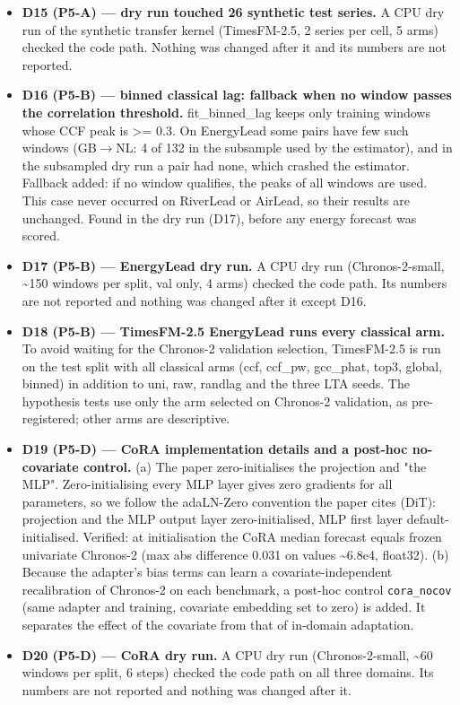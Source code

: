 \begin{itemize}
\item \textbf{D15 (P5-A) — dry run touched 26 synthetic test series.} A CPU dry run of the synthetic transfer kernel (TimesFM-2.5, 2 series per cell, 5 arms) checked the code path. Nothing was changed after it and its numbers are not reported.
\item \textbf{D16 (P5-B) — binned classical lag: fallback when no window passes the correlation threshold.} fit\_binned\_lag keeps only training windows whose CCF peak is >= 0.3. On EnergyLead some pairs have few such windows (GB$\rightarrow$NL: 4 of 132 in the subsample used by the estimator), and in the subsampled dry run a pair had none, which crashed the estimator. Fallback added: if no window qualifies, the peaks of all windows are used. This case never occurred on RiverLead or AirLead, so their results are unchanged. Found in the dry run (D17), before any energy forecast was scored.
\item \textbf{D17 (P5-B) — EnergyLead dry run.} A CPU dry run (Chronos-2-small, \textasciitilde{}150 windows per split, val only, 4 arms) checked the code path. Its numbers are not reported and nothing was changed after it except D16.
\item \textbf{D18 (P5-B) — TimesFM-2.5 EnergyLead runs every classical arm.} To avoid waiting for the Chronos-2 validation selection, TimesFM-2.5 is run on the test split with all classical arms (ccf, ccf\_pw, gcc\_phat, top3, global, binned) in addition to uni, raw, randlag and the three LTA seeds. The hypothesis tests use only the arm selected on Chronos-2 validation, as pre-registered; other arms are descriptive.
\item \textbf{D19 (P5-D) — CoRA implementation details and a post-hoc no-covariate control.} (a) The paper zero-initialises the projection and "the MLP". Zero-initialising every MLP layer gives zero gradients for all parameters, so we follow the adaLN-Zero convention the paper cites (DiT): projection and the MLP output layer zero-initialised, MLP first layer default-initialised. Verified: at initialisation the CoRA median forecast equals frozen univariate Chronos-2 (max abs difference 0.031 on values \textasciitilde{}6.8e4, float32). (b) Because the adapter's bias terms can learn a covariate-independent recalibration of Chronos-2 on each benchmark, a post-hoc control \texttt{cora\_nocov} (same adapter and training, covariate embedding set to zero) is added. It separates the effect of the covariate from that of in-domain adaptation.
\item \textbf{D20 (P5-D) — CoRA dry run.} A CPU dry run (Chronos-2-small, \textasciitilde{}60 windows per split, 6 steps) checked the code path on all three domains. Its numbers are not reported and nothing was changed after it.

\end{itemize}

